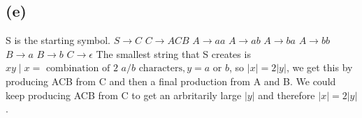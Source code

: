 \documentclass[12pt]{article}
\begin{document}
\subsection*{(e)} S is the starting symbol.
\newline
$S \rightarrow C$ \newline
$C \rightarrow ACB$ \newline
$A \rightarrow aa$ \newline
$A \rightarrow ab$ \newline
$A \rightarrow ba$ \newline
$A \rightarrow bb$ \newline
$B \rightarrow a$ \newline
$B \rightarrow b$ \newline
$C \rightarrow \epsilon$ \newline
The smallest string that S creates is $xy \mid x = \text{ combination of 2 }
a/b \text{ characters}, y =  a \text{ or } b$, so $|x| = 2|y|$, we get this by
producing ACB from C and then a final production from A and B.  We could keep
producing ACB from C to get an arbritarily large $|y|$ and therefore
$|x| = 2|y|$.
\end{document}
